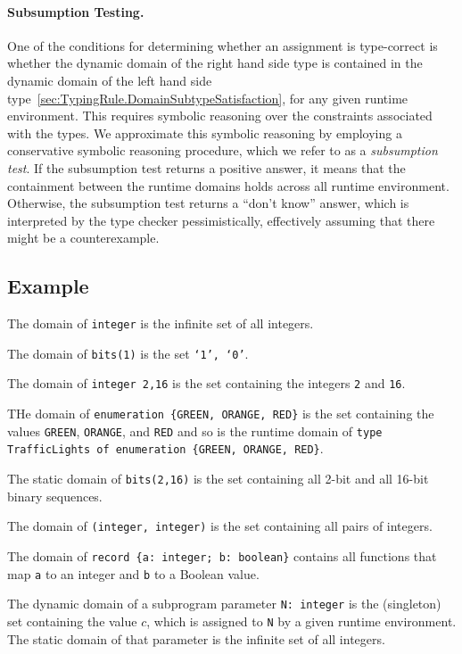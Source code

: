 \documentclass{book}
\begin{document}
  \paragraph{Subsumption Testing.}
  One of the conditions for determining whether an assignment is type-correct is whether the dynamic domain of the
  right hand side type is contained in the dynamic domain of the left hand side type~\ref{sec:TypingRule.DomainSubtypeSatisfaction},
  for any given runtime environment.
  This requires symbolic reasoning over the constraints associated with the types.
  We approximate this symbolic reasoning by employing a conservative symbolic reasoning procedure,
  which we refer to as a \emph{subsumption test}.
  If the subsumption test returns a positive answer, it means that the containment between the runtime domains holds across all
  runtime environment.
  Otherwise, the subsumption test returns a ``don't know'' answer, which is interpreted by the type checker pessimistically,
  effectively assuming that there might be a counterexample.

  \subsection{Example}
  The domain of \texttt{integer} is the infinite set of all integers.

  The domain of \texttt{bits(1)} is the set \texttt{{‘1’, ‘0’}}.

  The domain of \texttt{integer {2,16}} is the set containing the integers \texttt{2} and \texttt{16}.

  THe domain of \texttt{enumeration \{GREEN, ORANGE, RED\}} is the set containing the values
  \texttt{GREEN}, \texttt{ORANGE}, and \texttt{RED} and so is the runtime domain 
  of \texttt{type TrafficLights of enumeration \{GREEN, ORANGE, RED\}}.

  The static domain of \texttt{bits({2,16})} is the set containing all 2-bit and all 16-bit binary sequences.

  The domain of \texttt{(integer, integer)} is the set containing all pairs of integers.

  The domain of \texttt{record \{a: integer;  b: boolean\}} contains all functions that map \texttt{a} to an integer and \texttt{b} to a Boolean value.

  The dynamic domain of a subprogram parameter \texttt{N: integer} is the (singleton) set containing the value $c$,
  which is assigned to \texttt{N} by a given runtime environment. The static domain of that parameter
  is the infinite set of all integers.
\end{document}
